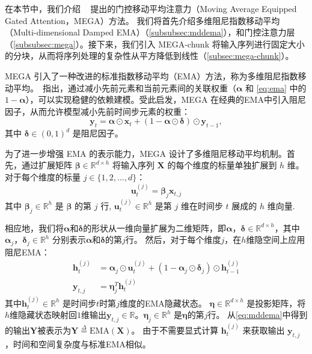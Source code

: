 \label{subsec:mega}

在本节中，我们介绍 ~\cite{ma2023mega} 提出的门控移动平均注意力（Moving Average Equipped Gated Attention，MEGA）方法。
我们将首先介绍多维阻尼指数移动平均（Multi-dimensional Damped EMA）（\ref{subsubsec:mddema}），和门控注意力层（\ref{subsubsec:mega}）。接下来，我们引入 MEGA-chunk 将输入序列进行固定大小的分块，从而将序列处理的复杂性从平方降低到线性（\ref{subsec:mega-chunk}）。

\label{subsubsec:mddema}

MEGA 引入了一种改进的标准指数移动平均（EMA）方法，称为多维阻尼指数移动平均。~\cite{svetunkov2016complex}指出，通过减小先前元素和当前元素间的关联权重（$\boldsymbol{\alpha}$ 和 \eqref{eq:ema} 中的 $1 - \boldsymbol{\alpha}$），可以实现稳健的依赖建模。受此启发，MEGA 在经典的EMA中引入阻尼因子，从而允许模型减小先前时间步元素的权重：
\begin{equation}
\label{eq:damping}
\mathbf{y}_t = \boldsymbol{\alpha} \odot \mathbf{x}_t + (1 - \boldsymbol{\alpha} \odot \boldsymbol{\delta}) \odot \mathbf{y}_{t-1},
\end{equation}
其中 $\boldsymbol{\delta} \in (0, 1)^{d}$ 是阻尼因子。

为了进一步增强 EMA 的表示能力，MEGA 设计了多维阻尼移动平均机制。首先，通过扩展矩阵 $\boldsymbol{\beta} \in \mathbb{R}^{d\times h}$ 将输入序列 $\boldsymbol{X}$ 的每个维度的标量单独扩展到 $h$ 维。对于每个维度的标量 $j \in \{1, 2, \ldots, d\}$：
\begin{equation}
\mathbf{u}^{(j)}_t = \boldsymbol{\beta}_j \mathbf{x}_{t,j}
\end{equation}
其中 $\boldsymbol{\beta}_j \in \mathbb{R}^{h}$ 是 $\boldsymbol{\beta}$ 的第 $j$ 行,  $\mathbf{u}^{(j)}_t \in \mathbb{R}^{h}$ 是第 $j$ 维在时间步 $t$ 展成的 $h$ 维向量.

相应地，我们将$\boldsymbol{\alpha}$和$\boldsymbol{\delta}$的形状从一维向量扩展为二维矩阵，即$\boldsymbol{\alpha}$，$\boldsymbol{\delta} \in \mathbb{R}^{d\times h}$，其中$\boldsymbol{\alpha}_j$，$\boldsymbol{\delta}_j \in \mathbb{R}^{h}$ 分别表示$\boldsymbol{\alpha}$和$\boldsymbol{\delta}$的第$j$行。
然后，对于每个维度$j$，在$h$维隐空间上应用阻尼EMA：
\begin{align}
\label{eq:mddema}
\mathbf{h}^{(j)}_t & = \boldsymbol{\alpha}_j \odot \mathbf{u}^{(j)}_t + (1 - \boldsymbol{\alpha}_j \odot \boldsymbol{\delta}_j) \odot \mathbf{h}^{(j)}_{t-1} \nonumber \\
\mathbf{y}_{t,j} & = \boldsymbol{\eta}^T_j \mathbf{h}^{(j)}_t
\end{align}
其中$\mathbf{h}^{(j)}_t \in \mathbb{R}^{h}$ 是时间步$t$时第$j$维度的EMA隐藏状态。
$\boldsymbol{\eta} \in \mathbb{R}^{d\times h}$ 是投影矩阵，将$h$维隐藏状态映射回$1$维输出$\mathbf{y}_{t,j} \in \mathbb{R}$。$\boldsymbol{\eta}_j \in \mathbb{R}^{h}$ 是$\boldsymbol{\eta}$的第$j$行。
从\eqref{eq:mddema}中得到的输出$\boldsymbol{Y}$被表示为$\boldsymbol{Y} \stackrel{\Delta}{=} \mathrm{EMA}(\boldsymbol{X})$。
由于不需要显式计算 $\mathbf{h}^{(j)}_t$ 来获取输出 $\mathbf{y}_{t,j}$，时间和空间复杂度与标准EMA相似。

